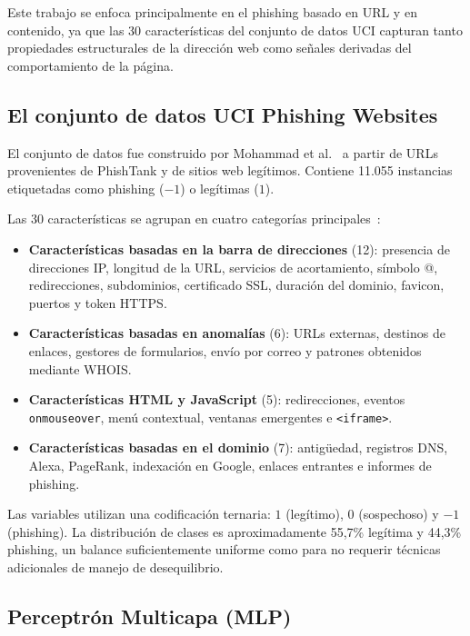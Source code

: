 \documentclass[conference]{IEEEtran}
\begin{document}
Este trabajo se enfoca principalmente en el phishing basado en URL y en contenido, ya que las 30 características del conjunto de datos UCI capturan tanto propiedades estructurales de la dirección web como señales derivadas del comportamiento de la página.

\subsection{El conjunto de datos UCI Phishing Websites}

El conjunto de datos fue construido por Mohammad et al.~\cite{mohammad2012,mohammad2014} a partir de URLs provenientes de PhishTank y de sitios web legítimos. Contiene 11.055 instancias etiquetadas como phishing ($-1$) o legítimas ($1$).

Las 30 características se agrupan en cuatro categorías principales~\cite{mohammad2014}:

\begin{itemize}

\item \textbf{Características basadas en la barra de direcciones} (12): presencia de direcciones IP, longitud de la URL, servicios de acortamiento, símbolo @, redirecciones, subdominios, certificado SSL, duración del dominio, favicon, puertos y token HTTPS.

\item \textbf{Características basadas en anomalías} (6): URLs externas, destinos de enlaces, gestores de formularios, envío por correo y patrones obtenidos mediante WHOIS.

\item \textbf{Características HTML y JavaScript} (5): redirecciones, eventos \texttt{onmouseover}, menú contextual, ventanas emergentes e \texttt{<iframe>}.

\item \textbf{Características basadas en el dominio} (7): antigüedad, registros DNS, Alexa, PageRank, indexación en Google, enlaces entrantes e informes de phishing.
\end{itemize}

Las variables utilizan una codificación ternaria: $1$ (legítimo), $0$ (sospechoso) y $-1$ (phishing). La distribución de clases es aproximadamente 55,7\% legítima y 44,3\% phishing, un balance suficientemente uniforme como para no requerir técnicas adicionales de manejo de desequilibrio.

\subsection{Perceptrón Multicapa (MLP)}
\end{document}
